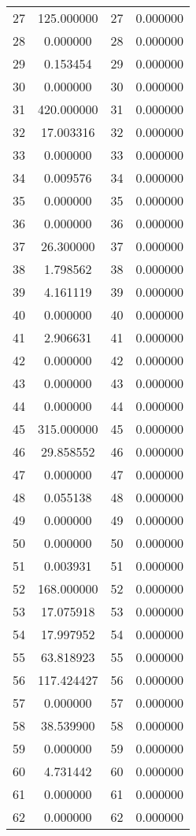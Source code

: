 \documentclass[12pt]{article}
\begin{document}
\begin{longtable}{@{}cccc@{}}
27 & 125.000000 & 27 & 0.000000 \\
28 & 0.000000 & 28 & 0.000000 \\
29 & 0.153454 & 29 & 0.000000 \\
30 & 0.000000 & 30 & 0.000000 \\
31 & 420.000000 & 31 & 0.000000 \\
32 & 17.003316 & 32 & 0.000000 \\
33 & 0.000000 & 33 & 0.000000 \\
34 & 0.009576 & 34 & 0.000000 \\
35 & 0.000000 & 35 & 0.000000 \\
36 & 0.000000 & 36 & 0.000000 \\
37 & 26.300000 & 37 & 0.000000 \\
38 & 1.798562 & 38 & 0.000000 \\
39 & 4.161119 & 39 & 0.000000 \\
40 & 0.000000 & 40 & 0.000000 \\
41 & 2.906631 & 41 & 0.000000 \\
42 & 0.000000 & 42 & 0.000000 \\
43 & 0.000000 & 43 & 0.000000 \\
44 & 0.000000 & 44 & 0.000000 \\
45 & 315.000000 & 45 & 0.000000 \\
46 & 29.858552 & 46 & 0.000000 \\
47 & 0.000000 & 47 & 0.000000 \\
48 & 0.055138 & 48 & 0.000000 \\
49 & 0.000000 & 49 & 0.000000 \\
50 & 0.000000 & 50 & 0.000000 \\
51 & 0.003931 & 51 & 0.000000 \\
52 & 168.000000 & 52 & 0.000000 \\
53 & 17.075918 & 53 & 0.000000 \\
54 & 17.997952 & 54 & 0.000000 \\
55 & 63.818923 & 55 & 0.000000 \\
56 & 117.424427 & 56 & 0.000000 \\
57 & 0.000000 & 57 & 0.000000 \\
58 & 38.539900 & 58 & 0.000000 \\
59 & 0.000000 & 59 & 0.000000 \\
60 & 4.731442 & 60 & 0.000000 \\
61 & 0.000000 & 61 & 0.000000 \\
62 & 0.000000 & 62 & 0.000000 \\

\end{longtable}
\end{document}
